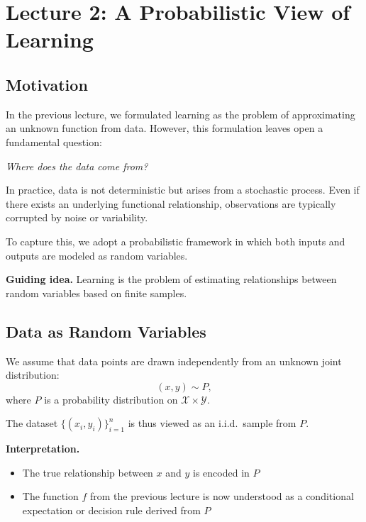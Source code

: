 \section{Lecture 2: A Probabilistic View of Learning}

\subsection{Motivation}

In the previous lecture, we formulated learning as the problem of approximating an unknown function from data. However, this formulation leaves open a fundamental question:

\medskip

\noindent
\textit{Where does the data come from?}

\medskip

\noindent
In practice, data is not deterministic but arises from a stochastic process. Even if there exists an underlying functional relationship, observations are typically corrupted by noise or variability.

\medskip

\noindent
To capture this, we adopt a probabilistic framework in which both inputs and outputs are modeled as random variables.

\medskip

\noindent
\textbf{Guiding idea.}  
Learning is the problem of estimating relationships between random variables based on finite samples.

\subsection{Data as Random Variables}

We assume that data points are drawn independently from an unknown joint distribution:
\[
(x, y) \sim P,
\]
where $P$ is a probability distribution on $\mathcal{X} \times \mathcal{Y}$.

\medskip

\noindent
The dataset $\{(x_i, y_i)\}_{i=1}^n$ is thus viewed as an i.i.d.\ sample from $P$.

\medskip

\noindent
\textbf{Interpretation.}
\begin{itemize}
    \item The true relationship between $x$ and $y$ is encoded in $P$
    \item The function $f$ from the previous lecture is now understood as a conditional expectation or decision rule derived from $P$
\end{itemize}

